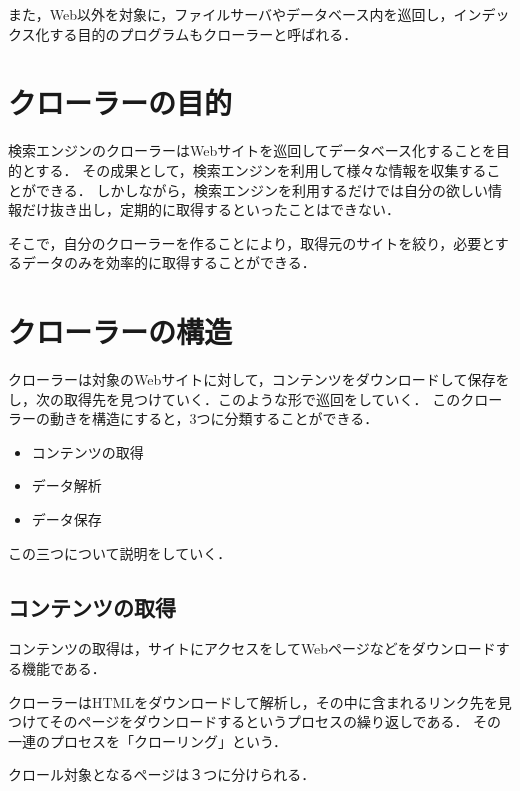 また，Web以外を対象に，ファイルサーバやデータベース内を巡回し，インデックス化する目的のプログラムもクローラーと呼ばれる\cite{miyake}．




\section{クローラーの目的}
検索エンジンのクローラーはWebサイトを巡回してデータベース化することを目的とする．
その成果として，検索エンジンを利用して様々な情報を収集することができる．
しかしながら，検索エンジンを利用するだけでは自分の欲しい情報だけ抜き出し，定期的に取得するといったことはできない．

そこで，自分のクローラーを作ることにより，取得元のサイトを絞り，必要とするデータのみを効率的に取得することができる\cite{miyake}．


\section{クローラーの構造}

クローラーは対象のWebサイトに対して，コンテンツをダウンロードして保存をし，次の取得先を見つけていく．このような形で巡回をしていく．
このクローラーの動きを構造にすると，3つに分類することができる．

\begin{itemize}
  \item コンテンツの取得
  \item データ解析
  \item データ保存
\end{itemize}


この三つについて説明をしていく\cite{miyake}．


\subsection{コンテンツの取得}
コンテンツの取得は，サイトにアクセスをしてWebページなどをダウンロードする機能である．

クローラーはHTMLをダウンロードして解析し，その中に含まれるリンク先を見つけてそのページをダウンロードするというプロセスの繰り返しである．
その一連のプロセスを「クローリング」という．


クロール対象となるページは３つに分けられる．

